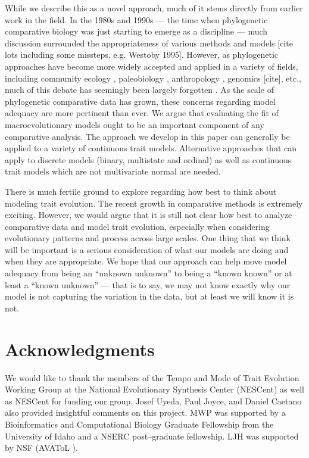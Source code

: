 \documentclass[a4paper,12pt]{article}
\begin{document}
While we describe this as a novel approach, much of it stems directly from earlier work in the field. In the 1980s and 1990s --- the time when phylogenetic comparative biology was just starting to emerge as a discipline --- much discussion surrounded the appropriateness of various methods and models [cite lots including some missteps, e.g. Westoby 1995]. However, as phylogenetic approaches have become more widely accepted and applied in a variety of fields, including community ecology \citep{Webb2002, CB2009, Mayfield2010, PennellHarmon}, paleobiology \citep{Hunt2012}, anthropology \citep{Nunnbook}, genomics [cite], etc., much of this debate has seemingly been largely forgotten \citep[but see][]{Losos2011, Hansen2012}. As the scale of phylogenetic comparative data has grown, these concerns regarding model adequacy are more pertinent than ever. We argue that evaluating the fit of macroevolutionary models ought to be an important component of any comparative analysis. The approach we develop in this paper can generally be applied to a variety of continuous trait models. Alternative approaches that can apply to discrete models (binary, multistate and ordinal) as well as continuous trait models which are not multivariate normal are needed. 

There is much fertile ground to explore regarding how best to think about modeling trait evolution. The recent growth in comparative methods is extremely exciting. However, we would argue that it is still not clear how best to analyze comparative data and model trait evolution, especially when considering evolutionary patterns and process across large scales. One thing that we think will be important is a serious consideration of what our models are doing and when they are appropriate. We hope that our approach can help move model adequacy from being an ``unknown unknown''  to being a ``known known'' or at least a ``known unknown'' --- that is to say, we may not know exactly why our model is not capturing the variation in the data, but at least we will know it is not.


\section*{Acknowledgments}

We would like to thank the members of the Tempo and Mode of Trait Evolution Working Group at the National Evolutionary Synthesis Center (NESCent) as well as NESCent for funding our group. Josef Uyeda, Paul Joyce, and Daniel Caetano also provided insightful comments on this project. MWP was supported by a Bioinformatics and Computational Biology Graduate Fellowship from the University of Idaho and a NSERC post--graduate fellowship. LJH was supported by NSF (AVAToL ).



\newpage


\end{document}
